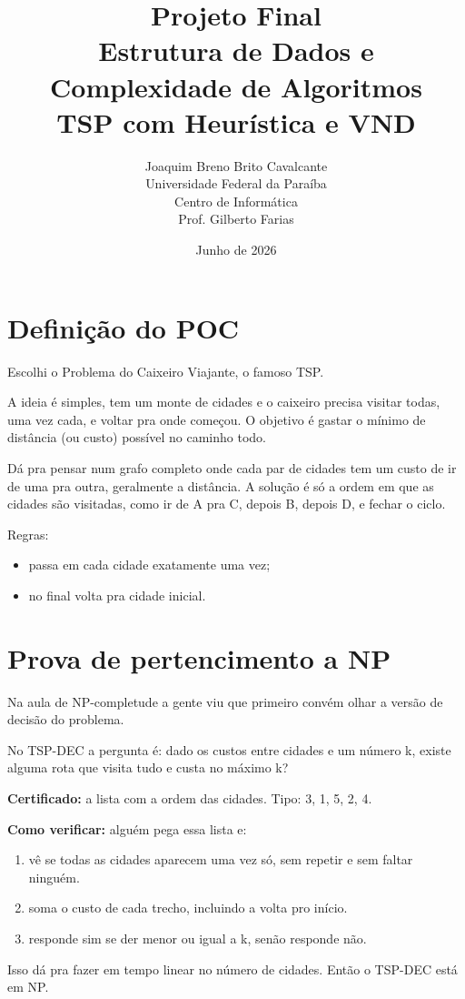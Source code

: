 \documentclass[12pt,a4paper]{article}
\title{Projeto Final\\Estrutura de Dados e Complexidade de Algoritmos\\TSP com Heurística e VND}
\author{Joaquim Breno Brito Cavalcante \\ Universidade Federal da Paraíba \\ Centro de Informática \\ Prof. Gilberto Farias}
\date{Junho de 2026}
\begin{document}
\maketitle

\section{Definição do POC}

Escolhi o Problema do Caixeiro Viajante, o famoso TSP.

A ideia é simples, tem um monte de cidades e o caixeiro precisa visitar todas, uma vez cada, e voltar pra onde começou. O objetivo é gastar o mínimo de distância (ou custo) possível no caminho todo.

Dá pra pensar num grafo completo onde cada par de cidades tem um custo de ir de uma pra outra, geralmente a distância. A solução é só a ordem em que as cidades são visitadas, como ir de A pra C, depois B, depois D, e fechar o ciclo.

Regras:
\begin{itemize}
    \item passa em cada cidade exatamente uma vez;
    \item no final volta pra cidade inicial.
\end{itemize}


\section{Prova de pertencimento a NP}

Na aula de NP-completude a gente viu que primeiro convém olhar a versão de decisão do problema.

No TSP-DEC a pergunta é: dado os custos entre cidades e um número k, existe alguma rota que visita tudo e custa no máximo k?

\textbf{Certificado:} a lista com a ordem das cidades. Tipo: 3, 1, 5, 2, 4.

\textbf{Como verificar:} alguém pega essa lista e:
\begin{enumerate}
    \item vê se todas as cidades aparecem uma vez só, sem repetir e sem faltar ninguém.
    \item soma o custo de cada trecho, incluindo a volta pro início.
    \item responde sim se der menor ou igual a k, senão responde não.
\end{enumerate}

Isso dá pra fazer em tempo linear no número de cidades. Então o TSP-DEC está em NP.
\end{document}
